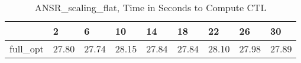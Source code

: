 \begin{table}
\caption{ANSR\_scaling\_flat, Time in Seconds to Compute CTL}
\label{ANSR_scaling_flat_CTL_time}
\begin{tabular}{lllllllll}
\toprule
 & 2 & 6 & 10 & 14 & 18 & 22 & 26 & 30 \\
\midrule
full\_opt & 27.80 & 27.74 & 28.15 & 27.84 & 27.84 & 28.10 & 27.98 & 27.89 \\
\bottomrule
\end{tabular}
\end{table}
